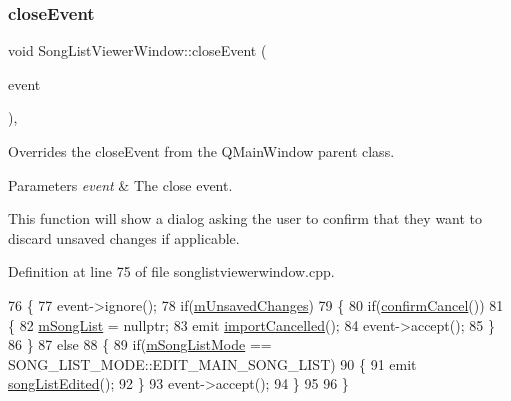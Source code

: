 \subsubsection{\texorpdfstring{close\+Event}{closeEvent}}
{\footnotesize\ttfamily void Song\+List\+Viewer\+Window\+::close\+Event (\begin{DoxyParamCaption}\item[{Q\+Close\+Event $\ast$}]{event }\end{DoxyParamCaption})\hspace{0.3cm}{\ttfamily [private]}, {\ttfamily [slot]}}



Overrides the close\+Event from the Q\+Main\+Window parent class. 


\begin{DoxyParams}{Parameters}
{\em event} & The close event.\\
\hline
\end{DoxyParams}
This function will show a dialog asking the user to confirm that they want to discard unsaved changes if applicable. 

Definition at line 75 of file songlistviewerwindow.\+cpp.


\begin{DoxyCode}
76 \{
77     \textcolor{keyword}{event}->ignore();
78     \textcolor{keywordflow}{if}(\mbox{\hyperlink{class_song_list_viewer_window_a150efbd08beb368c4acc65621d03d35d}{mUnsavedChanges}})
79     \{
80         \textcolor{keywordflow}{if}(\mbox{\hyperlink{class_song_list_viewer_window_a7ed91cc8081f236e051a7255af708b79}{confirmCancel}}())
81         \{
82             \mbox{\hyperlink{class_song_list_viewer_window_a02558cb095f356a1288e5663bc2e1955}{mSongList}} = \textcolor{keyword}{nullptr};
83             emit \mbox{\hyperlink{class_song_list_viewer_window_a2f54dad3e714cd08fd85080a8865f616}{importCancelled}}();
84             \textcolor{keyword}{event}->accept();
85         \}
86     \}
87     \textcolor{keywordflow}{else}
88     \{
89         \textcolor{keywordflow}{if}(\mbox{\hyperlink{class_song_list_viewer_window_a1c242af144718150837feff19386dc73}{mSongListMode}} == SONG\_LIST\_MODE::EDIT\_MAIN\_SONG\_LIST)
90         \{
91             emit \mbox{\hyperlink{class_song_list_viewer_window_a6fb4b39cdd5f7b9a3f8b12bcb2ec4c35}{songListEdited}}();
92         \}
93         \textcolor{keyword}{event}->accept();
94     \}
95 
96 \}
\end{DoxyCode}
\mbox{\label{class_song_list_viewer_window_a7ed91cc8081f236e051a7255af708b79}} 
